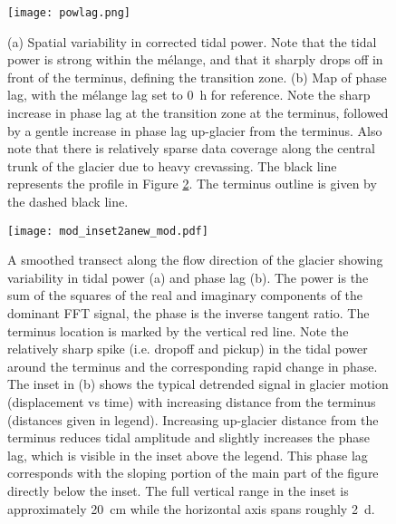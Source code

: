 \begin{figure}
\centering
\texttt{[image: powlag.png]}
\caption[(a) Spatial variability in corrected tidal power.]{(a) Spatial variability in corrected tidal power. Note that the tidal power is strong within the m\'elange, and that it sharply drops off in front of the terminus, defining the transition zone. (b) Map of phase lag, with the m\'elange lag set to 0~h for reference. Note the sharp increase in phase lag at the  transition zone at the terminus, followed by a gentle increase in phase lag up-glacier from the terminus. Also note that there is relatively sparse data coverage along the central trunk of the glacier due to heavy crevassing. The black line represents the profile in Figure \ref{fig:profiles}. The terminus outline is given by the dashed black line.}
\label{fig:maps}
\end{figure}



\begin{figure}
\centering
\texttt{[image: mod\_inset2anew\_mod.pdf]}
\caption[A smoothed transect along the flow direction of the glacier showing variability in tidal power (a) and phase lag (b).]{A smoothed transect along the flow direction of the glacier showing variability in tidal power (a) and phase lag (b). The power is the sum of the squares of the real and imaginary components of the dominant FFT signal, the phase is the inverse tangent ratio.  The terminus location is marked by the vertical red line. Note the relatively sharp spike (i.e. dropoff and pickup) in the tidal power around the terminus and the corresponding rapid change in phase. The inset in (b) shows the typical detrended signal in glacier motion (displacement vs time) with increasing distance from the terminus (distances given in legend). Increasing up-glacier distance from the terminus reduces tidal amplitude and slightly increases the phase lag, which is visible in the inset above the legend. This phase lag corresponds with the sloping portion of the main part of the figure directly below the inset. The full vertical range in the inset is approximately 20~cm while the horizontal axis spans roughly 2~d.}
\label{fig:profiles}
\end{figure}

